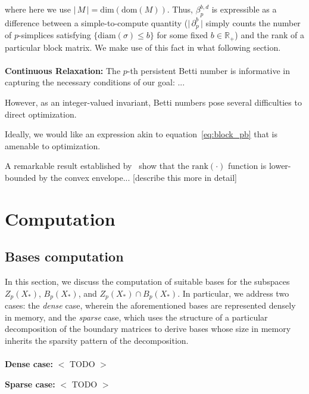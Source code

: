 \documentclass[10pt]{article}
\begin{document}
where here we use $\lvert \, M \, \rvert = \mathrm{dim}(\mathrm{dom}(M))$. Thus, $\beta_p^{b,d}$ is expressible as a difference between a simple-to-compute quantity ($\lvert \, \partial_p^b \, \rvert$ simply counts the number of $p$-simplices satisfying $\{ \mathrm{diam}(\sigma) \leq b \}$ for some fixed $b \in \mathbb{R}_+$) and the rank of a particular block matrix. We make use of this fact in what following section. 
\\
\\
\noindent \textbf{Continuous Relaxation:} 
The $p$-th persistent Betti number is informative in capturing the necessary conditions of our goal: ...

However, as an integer-valued invariant, Betti numbers pose several difficulties to direct optimization. 

Ideally, we would like an expression akin to equation~\eqref{eq:block_pb} that is amenable to optimization.

A remarkable result established by~\cite{} show that the $\mathrm{rank}(\cdot)$ function is lower-bounded by the convex envelope... [describe this more in detail]

\section{Computation}
\subsection*{Bases computation}
In this section, we discuss the computation of suitable bases for the subspaces $Z_p(X_\ast)$, $B_p(X_\ast)$, and $Z_p(X_\ast) \cap B_p(X_\ast)$. In particular, we address two cases: the \emph{dense} case, wherein the aforementioned bases are represented densely in memory, and the \emph{sparse} case, which uses the structure of a particular decomposition of the boundary matrices to derive bases whose size in memory inherits the sparsity pattern of the decomposition.
\\
\\
\textbf{Dense case:} 
$<$ TODO $>$

\textbf{Sparse case:} 
$<$ TODO $>$

\appendix
\end{document}
